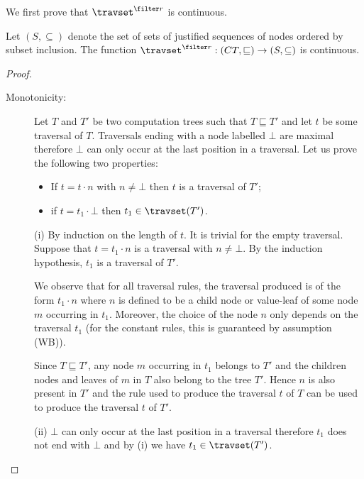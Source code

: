 We first prove that $\travset^{\filter r}$ is continuous.
\begin{lemma}
\label{lem:travred_continuous} Let $(S,\subseteq)$ denote the set of
sets of justified sequences of nodes ordered by subset inclusion.
The function $\travset^{\filter r} : (CT,\sqsubseteq)
\rightarrow (S,\subseteq)$ is continuous.
\end{lemma}
\begin{proof} \
    \begin{description}
    \item[Monotonicity:] Let $T$ and $T'$ be two computation trees such that $T \sqsubseteq T'$
    and let $t$ be some traversal of $T$.
    Traversals ending with a node labelled $\bot$ are maximal therefore $\bot$ can only occur
    at the last position in a traversal. Let us prove the following two properties:
        \begin{itemize}
            \item[(i)]  If $t = t \cdot n$ with $n\neq \bot$ then $t$ is a traversal of $T'$;
            \item[(ii)] if $t= t_1 \cdot \bot$ then $t_1\in \travset(T')$.
        \end{itemize}

        (i) By induction on the length of $t$. It is trivial for the empty traversal.
            Suppose that $t = t_1 \cdot n$ is a traversal with $n \neq \bot$.
            By the induction hypothesis, $t_1$ is a traversal of $T'$.

            We observe that for all traversal rules, the traversal produced is of the form $t_1 \cdot n$ where
            $n$ is defined to be a child node or value-leaf of some node $m$ occurring in $t_1$.
            Moreover, the choice of the node $n$ only depends on the traversal $t_1$
            (for the constant rules, this is guaranteed by assumption (WB)).

            Since $T \sqsubseteq T'$, any node $m$ occurring in $t_1$ belongs
            to $T'$ and the children nodes and leaves of $m$ in $T$ also belong to the tree $T'$.
            Hence $n$ is also present in $T'$ and the rule used to produce the traversal $t$ of $T$
            can be used to produce the traversal $t$ of $T'$.

        (ii) $\bot$ can only occur at the last position in a traversal
        therefore $t_1$ does not end with $\bot$ and by (i) we have $t_1\in \travset(T')$.
\vspace{6pt}


\end{description}
\end{proof}

